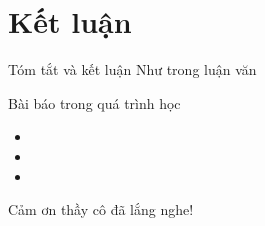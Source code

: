 
\section*{Kết luận}

\begin{frame}{Tóm tắt và kết luận}
    Như trong luận văn
\end{frame}

\begin{frame}{Bài báo trong quá trình học}
    \begin{itemize}
        \item {}
        \item {}
        \item {}
    \end{itemize}
\end{frame}

\begin{frame}{}
    \centering \Huge Cảm ơn thầy cô đã lắng nghe!
\end{frame}